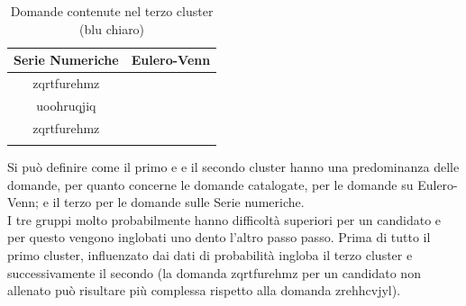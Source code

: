 \begin{longtable}{|c|c|}
	\hline
	\textbf{Serie Numeriche} & \textbf{Eulero-Venn} \\\hline\hline
	zqrtfurehmz &  \\
	uoohruqjiq  & \\
	zqrtfurehmz & \\
	
\hline
\caption{Domande contenute nel terzo cluster (blu chiaro)}\label{tab:Domande contenute nel terzo cluster}
\end{longtable}
\noindent
Si pu\`o definire come il primo e e il secondo cluster hanno una predominanza delle domande, per quanto concerne le domande catalogate, per le domande su Eulero-Venn; e il terzo per le domande sulle Serie numeriche.\\
I tre gruppi molto probabilmente hanno difficolt\`a superiori per un candidato e per questo vengono inglobati uno dento l'altro passo passo.
Prima di tutto il primo cluster, influenzato dai dati di probabilit\`a ingloba il terzo cluster  e successivamente il secondo (la domanda zqrtfurehmz per un candidato non allenato pu\`o risultare pi\`u complessa rispetto alla domanda zrehhcvjyl).





